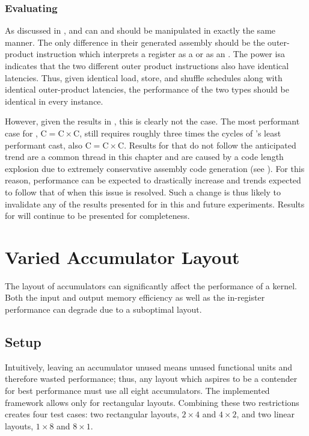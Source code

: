 \documentclass[\main/thesis.tex]{subfiles}
\begin{document}
\subsubsection{Evaluating \texorpdfstring{}{half}}
As discussed in ,  and  can and should be manipulated in exactly the same manner.
The only difference in their generated assembly should be the outer-product instruction which interprets a register as a  or as an .
The \gls{power} \gls{isa} indicates that the two different outer product instructions also have identical latencies.
Thus, given identical load, store, and shuffle schedules along with identical outer-product latencies, the performance of the two types should be identical in every instance.

However, given the results in , this is clearly not the case.
The most performant case for , $\textrm{C} = \textrm{C} \times \textrm{C}$, still requires roughly three times the cycles of 's least performant cast, also $\textrm{C} = \textrm{C} \times \textrm{C}$.
Results for  that do not follow the anticipated trend are a common thread in this chapter and are caused by a code length explosion due to extremely conservative assembly code generation (see ).
For this reason, performance can be expected to drastically increase and trends expected to follow that of  when this issue is resolved.
Such a change is thus likely to invalidate any of the results presented for  in this and future experiments.
Results for  will continue to be presented for completeness.

\section{Varied Accumulator Layout}
The layout of accumulators can significantly affect the performance of a kernel.
Both the input and output memory efficiency as well as the in-register performance can degrade due to a suboptimal layout.

\subsection{Setup}
Intuitively, leaving an accumulator unused means unused functional units and therefore wasted performance; thus, any layout which aspires to be a contender for best performance must use all eight accumulators.
The implemented framework allows only for rectangular layouts.
Combining these two restrictions creates four test cases: two rectangular layouts, $2 \times 4$ and $4 \times 2$, and two linear layouts, $1 \times 8$ and $8 \times 1$.
\end{document}
